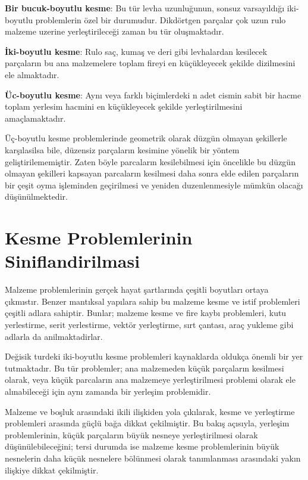 \documentclass[]{book}
\begin{document}
\textbf{Bir bucuk-boyutlu kesme}: Bu tür levha uzunluğunun, sonsuz varsayıldığı iki-boyutlu problemlerin özel bir durumudur. Dikdörtgen parçalar çok uzun rulo malzeme uzerine yerleştirileceği zaman bu tür oluşmaktadır.

\textbf{İki-boyutlu kesme}: Rulo saç, kumaş ve deri gibi levhalardan kesilecek parçaların bu ana malzemelere toplam fireyi en küçükleyecek şekilde dizilmesini ele almaktadır.

\textbf{Üc-boyutlu kesme}: Aynı veya farklı biçimlerdeki n adet cismin sabit bir hacme toplam yerlesim hacmini en küçükleyecek şekilde yerleştirilmesini amaçlamaktadır.

Üç-boyutlu kesme problemlerinde geometrik olarak düzgün olmayan şekillerle karşılasilsa bile, düzensiz parçaların kesimine yönelik bir yöntem geliştirilememiştir. Zaten böyle parcaların kesilebilmesi için öncelikle bu düzgün olmayan şekilleri kapsayan parcaların kesilmesi daha sonra elde edilen parçaların bir çeşit oyma işleminden geçirilmesi ve yeniden duzeıılenmesiyle mümkün olacağı düşünülmektedir.

\hypertarget{kesme-problemlerinin-siniflandirilmasi}{%
\section{Kesme Problemlerinin Siniflandirilmasi}\label{kesme-problemlerinin-siniflandirilmasi}}

Malzeme problemlerinin gerçek hayat şartlarında çeşitli boyutları ortaya çıkmıstır. Benzer mantıksal yapılara sahip bu malzeme kesme ve istif problemleri çeşitli adlara sahiptir. Bunlar; malzeme kesme ve fire kaybı problemleri, kutu yerlestirme, serit yerlestirme, vektör yerleştirme, sırt çantası, araç yukleme gibi adlarla da anilmaktadirlar.

Değisik turdeki iki-boyutlu kesme problemleri kaynaklarda oldukça önemli bir yer tutmaktadır. Bu tür problemler; ana malzemeden küçük parçaların kesilmesi olarak, veya küçük parcaların ana malzemeye yerleştirilmesi problemi olarak ele alınabileceği için aynı zamanda bir yerleşim problemidir.

Malzeme ve boşluk arasındaki ikili ilişkiden yola çıkılarak, kesme ve yerleştirme problemleri arasında güçlü bağa dikkat çekilmiştir. Bu bakış açısıyla, yerleşim problemlerinin, küçük parçaların büyük nesneye yerleştirilmesi olarak düşünülebileceğini; tersi durumda ise malzeme kesme problemlerinin büyük nesnelerin daha küçük nesnelere bölünmesi olarak tanımlanması arasındaki yakın ilişkiye dikkat çekilmiştir.
\end{document}
